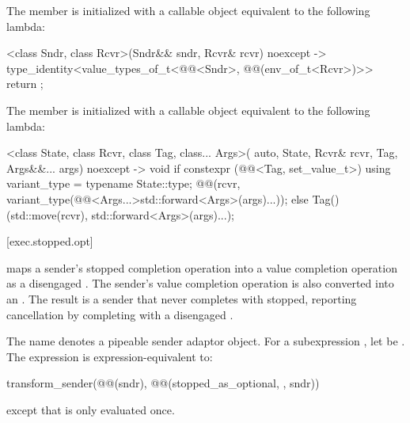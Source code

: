 \pnum
The member 
is initialized with a callable object equivalent to the following lambda:
\begin{codeblock}
[]<class Sndr, class Rcvr>(Sndr&& sndr, Rcvr& rcvr) noexcept
  -> type_identity<value_types_of_t<@@<Sndr>, @@(env_of_t<Rcvr>)>> {
  return {};
}
\end{codeblock}

\pnum
The member 
is initialized with a callable object equivalent to the following lambda:
\begin{codeblock}
[]<class State, class Rcvr, class Tag, class... Args>(
    auto, State, Rcvr& rcvr, Tag, Args&&... args) noexcept -> void {
  if constexpr (@@<Tag, set_value_t>) {
    using variant_type = typename State::type;
    @@(rcvr, variant_type(@@<Args...>{std::forward<Args>(args)...}));
  } else {
    Tag()(std::move(rcvr), std::forward<Args>(args)...);
  }
}
\end{codeblock}

[exec.stopped.opt]{}

\pnum
{} maps a sender's stopped completion operation
into a value completion operation as a disengaged .
The sender's value completion operation
is also converted into an .
The result is a sender that never completes with stopped,
reporting cancellation by completing with a disengaged .

\pnum
The name  denotes a pipeable sender adaptor object.
For a subexpression , let  be .
The expression  is expression-equivalent to:
\begin{codeblock}
transform_sender(@@(sndr), @@(stopped_as_optional, {}, sndr))
\end{codeblock}
except that  is only evaluated once.

